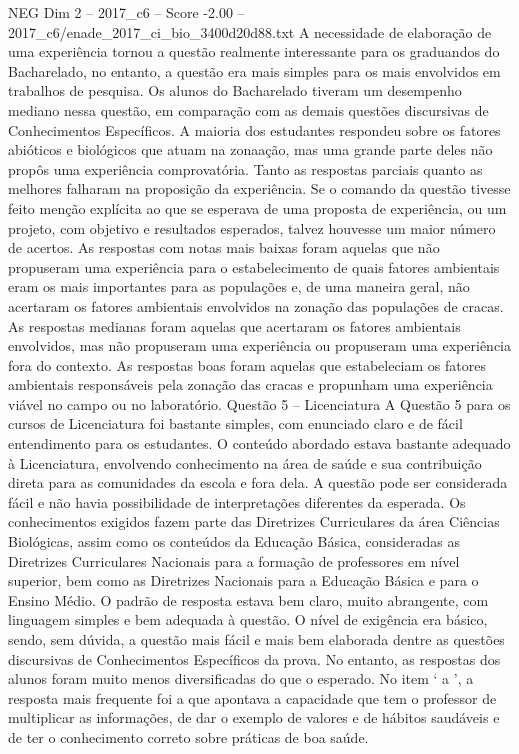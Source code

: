 \begin{textsample}{NEG Dim 2 – 2017\_c6 – Score -2.00 – 2017\_c6/enade\_2017\_ci\_bio\_3400d20d88.txt}
A necessidade de elaboração de uma experiência tornou a questão realmente interessante para os graduandos do Bacharelado, no entanto, a questão era mais simples para os mais envolvidos em trabalhos de pesquisa.
Os alunos do Bacharelado tiveram um desempenho mediano nessa questão, em comparação com as demais questões discursivas de Conhecimentos Específicos.
A maioria dos estudantes respondeu sobre os fatores abióticos e biológicos que atuam na zonaação, mas uma grande parte deles não propôs uma experiência comprovatória.
Tanto as respostas parciais quanto as melhores falharam na proposição da experiência.
Se o comando da questão tivesse feito menção explícita ao que se esperava de uma proposta de experiência, ou um projeto, com objetivo e resultados esperados, talvez houvesse um maior número de acertos.
As respostas com notas mais baixas foram aquelas que não propuseram uma experiência para o estabelecimento de quais fatores ambientais eram os mais importantes para as populações e, de uma maneira geral, não acertaram os fatores ambientais envolvidos na zonação das populações de cracas.
As respostas medianas foram aquelas que acertaram os fatores ambientais envolvidos, mas não propuseram uma experiência ou propuseram uma experiência fora do contexto.
As respostas boas foram aquelas que estabeleciam os fatores ambientais responsáveis pela zonação das cracas e propunham uma experiência viável no campo ou no laboratório.
Questão 5 – Licenciatura A Questão 5 para os cursos de Licenciatura foi bastante simples, com enunciado claro e de fácil entendimento para os estudantes.
O conteúdo abordado estava bastante adequado à Licenciatura, envolvendo conhecimento na área de saúde e sua contribuição direta para as comunidades da escola e fora dela.
A questão pode ser considerada fácil e não havia possibilidade de interpretações diferentes da esperada.
Os conhecimentos exigidos fazem parte das Diretrizes Curriculares da área Ciências Biológicas, assim como os conteúdos da Educação Básica, consideradas as Diretrizes Curriculares Nacionais para a formação de professores em nível superior, bem como as Diretrizes Nacionais para a Educação Básica e para o Ensino Médio.
O padrão de resposta estava bem claro, muito abrangente, com linguagem simples e bem adequada à questão.
O nível de exigência era básico, sendo, sem dúvida, a questão mais fácil e mais bem elaborada dentre as questões discursivas de Conhecimentos Específicos da prova.
No entanto, as respostas dos alunos foram muito menos diversificadas do que o esperado.
No item ‘ a ’, a resposta mais frequente foi a que apontava a capacidade que tem o professor de multiplicar as informações, de dar o exemplo de valores e de hábitos saudáveis e de ter o conhecimento correto sobre práticas de boa saúde.

\end{textsample}
